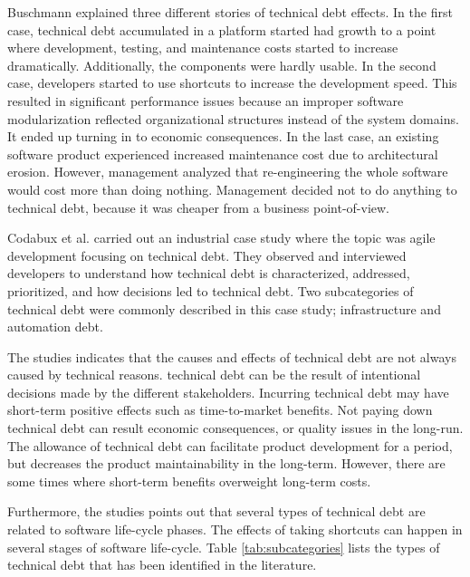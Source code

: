 Buschmann\cite{buschmann2011pay} explained three different stories of technical debt effects. In the first case, technical debt accumulated in a platform started had growth to a point where development, testing, and maintenance costs started to increase dramatically. Additionally, the components were hardly usable. In the second case, developers started to use shortcuts to increase the development speed. This resulted in significant performance issues because an improper software modularization reflected organizational structures instead of the system domains. It ended up turning in to economic consequences. In the last case, an existing software product experienced increased maintenance cost due to architectural erosion. However, management analyzed that re-engineering the whole software would cost more than doing nothing. Management decided not to do anything to technical debt, because it was cheaper from a business point-of-view.

Codabux et al.\cite{p8-codabux} carried out an industrial case study where the topic was agile development focusing on technical debt. They observed and interviewed developers to understand how technical debt is characterized, addressed, prioritized, and how decisions led to technical debt. Two subcategories of technical debt were commonly described in this case study; infrastructure and automation debt. 

The studies indicates that the causes and effects of technical debt are not always caused by technical reasons. technical debt can be the result of intentional decisions made by the different stakeholders. Incurring technical debt may have short-term positive effects such as time-to-market benefits. Not paying down technical debt can result economic consequences, or quality issues in the long-run. The allowance of technical debt can facilitate product development for a period, but decreases the product maintainability in the long-term. However, there are some times where short-term benefits overweight long-term costs\cite{guo2011tracking}. 

Furthermore, the studies points out that several types of technical debt are related to software life-cycle phases. The effects of taking shortcuts can happen in several stages of software life-cycle. Table \ref{tab:subcategories} lists the types of technical debt that has been identified in the literature.

